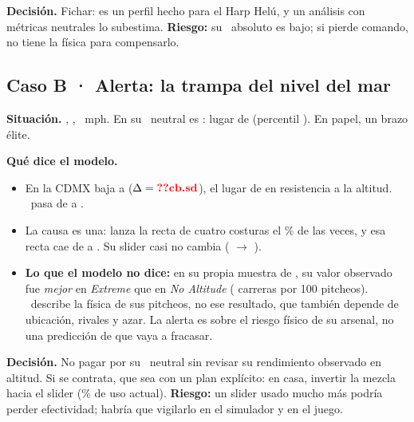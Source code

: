 \documentclass[10pt]{article}
\begin{document}
\begin{table}[H]\centering\small
\caption{Caso A: arsenal .}\label{tab:ca}
\end{table}

\textbf{Decisión.} Fichar: es un perfil hecho para el Harp Helú, y un análisis con métricas neutrales lo subestima. \textbf{Riesgo:} su \splus\ absoluto es bajo; si pierde comando, no tiene la física para compensarlo.

\subsection*{Caso B · Alerta: la trampa del nivel del mar}

\textbf{Situación.} , , ~mph. En  su \splus\ neutral es : lugar  de  (percentil ). En papel, un brazo élite.

\textbf{Qué dice el modelo.}
\begin{itemize}
  \item En la CDMX baja a  ($\Delta=\cf{cb.sd}$), el lugar  de  en resistencia a la altitud. \pplus\ pasa de  a .
  \item La causa es una: lanza la recta de cuatro costuras el \% de las veces, y esa recta cae de  a . Su slider casi no cambia ( $\to$ ).
  \item \textbf{Lo que el modelo no dice:} en su propia muestra de , su valor observado fue \emph{mejor} en \emph{Extreme} que en \emph{No Altitude} ( carreras por 100 pitcheos). \splus\ describe la física de sus pitcheos, no ese resultado, que también depende de ubicación, rivales y azar. La alerta es sobre el riesgo físico de su arsenal, no una predicción de que vaya a fracasar.
\end{itemize}

\begin{table}[H]\centering\small
\caption{Caso B: arsenal .}\label{tab:cb}
\end{table}

\textbf{Decisión.} No pagar por su \splus\ neutral sin revisar su rendimiento observado en altitud. Si se contrata, que sea con un plan explícito: en casa, invertir la mezcla hacia el slider (\% de uso actual). \textbf{Riesgo:} un slider usado mucho más podría perder efectividad; habría que vigilarlo en el simulador y en el juego.
\end{document}
